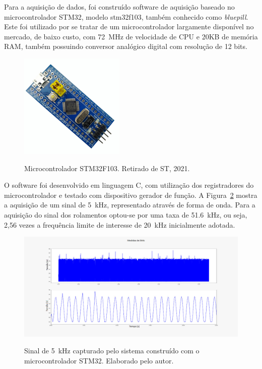 \documentclass[
	12pt,				
	oneside,			
	a4paper,			
	english,			
	brazil,			
	]{abntex2ppgsi}
\begin{document}
Para a aquisição de dados, foi construído software de aquisição baseado no microcontrolador STM32, modelo stm32f103, também conhecido como \textit{bluepill}. Este foi utilizado por se tratar de um microcontrolador largamente disponível no mercado, de baixo custo, com \SI{72}{\mega\hertz} de velocidade de CPU e 20KB de memória RAM, também possuindo conversor analógico digital com resolução de 12 bits. 

\begin{figure}[H]
\centering
\caption {Microcontrolador STM32F103. Retirado de ST, 2021.}
\includegraphics[width=\textwidth,height=50mm,keepaspectratio]{stm32}
\label{stm32}
\end{figure}

O software foi desenvolvido em linguagem C, com utilização dos registradores do microcontrolador e testado com dispositivo gerador de função. A Figura~\ref{medidas_sistema_aquisicao_stm32} mostra a aquisição de um sinal de \SI{5}{\kilo\hertz}, representado através de forma de onda. Para a aquisição do sinal dos rolamentos optou-se por uma taxa de \SI{51,6}{\kilo\hertz}, ou seja, 2,56 vezes a frequência limite de interesse de \SI{20}{\kilo\hertz} inicialmente adotada. 

\begin{figure}[H]
\centering
\caption {Sinal de \SI{5}{\kilo\hertz} capturado pelo sistema construído com o microcontrolador STM32. Elaborado pelo autor.}
\includegraphics[width=\textwidth,height=\textheight,keepaspectratio]{medidas_sistema_aquisicao_stm32}
\label{medidas_sistema_aquisicao_stm32}
\end{figure} 
\end{document}
